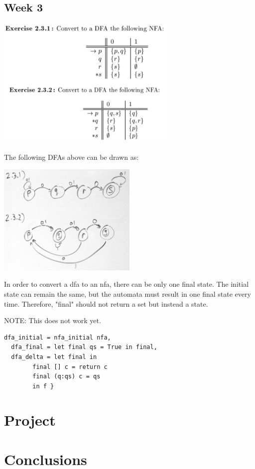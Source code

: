 \documentclass{article}
\theoremstyle{theorem}
\theoremstyle{definition}
\theoremstyle{remark}
\begin{document}
\subsection{Week 3}

\includegraphics[width=0.65\textwidth]{Images/2.3.1and2.3.2_chart.png}

\noindent
The following DFAs above can be drawn as:

\includegraphics[width=0.50\textwidth]{Images/2.3.1and2.3.2.png}

\medskip\noindent
In order to convert a dfa to an nfa, there can be only one final state. The initial state can remain the same, but the automata must result in one final state every time. Therefore, "final" should not return a set but instead a state.

\medskip\noindent
NOTE: This does not work yet.

\begin{lstlisting}[style=HaskellStyle]
  dfa_initial = nfa_initial nfa,
  dfa_final = let final qs = True in final,
  dfa_delta = let final in
        final [] c = return c
        final (q:qs) c = qs
        in f }
  \end{lstlisting}


\section{Project}
 

\section{Conclusions}\label{conclusions}

\begin{thebibliography}{99}

\end{thebibliography}
\end{document}

